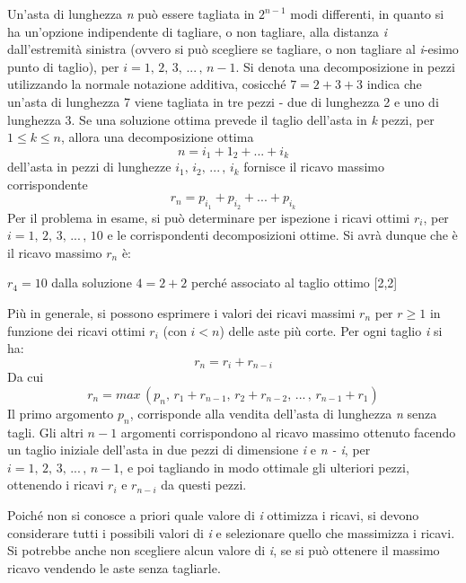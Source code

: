 \documentclass[10pt, a4paper]{report}
\begin{document}
Un'asta di lunghezza \textit{n} può essere tagliata in $2^{n-1}$ modi differenti, in quanto si ha un'opzione indipendente di tagliare, o non tagliare, alla distanza \textit{i} dall'estremità sinistra (ovvero si può scegliere se tagliare, o non tagliare al \textit{i}-esimo punto di taglio), per $i = 1,\,2,\,3,\,...\,,\,n - 1$. Si denota una decomposizione in pezzi utilizzando la normale notazione additiva, cosicché $7 = 2 + 3 + 3$ indica che un'asta di lunghezza 7 viene tagliata in tre pezzi - due di lunghezza 2 e uno di lunghezza 3. Se una soluzione ottima prevede il taglio dell'asta in \textit{k} pezzi, per $1 \leq k \leq n$, allora una decomposizione ottima
\begin{equation*}
n = i_1 + 1_2 + ... + i_k
\end{equation*}
dell'asta in pezzi di lunghezze $i_1,\,i_2,\,...\,,\,i_k$ fornisce il ricavo massimo corrispondente
\begin{equation*}
r_n = p_{i_1} + p_{i_2} + ... + p_{i_k}
\end{equation*}
Per il problema in esame, si può determinare per ispezione i ricavi ottimi $r_i$, per $i = 1,\,2,\,3,\,...\,,\,10$ e le corrispondenti decomposizioni ottime. Si avrà dunque che è il ricavo massimo $r_n$ è:
\begin{center}
$r_4 = 10$ dalla soluzione $4 = 2 + 2$ perché associato al taglio ottimo [2,2]
\end{center}
Più in generale, si possono esprimere i valori dei ricavi massimi $r_n$ per $r \geq 1$ in funzione dei ricavi ottimi $r_i$ (con $i < n$) delle aste più corte. Per ogni taglio \textit{i} si ha:
\begin{equation*}
r_n = r_i + r_{n-i}
\end{equation*}
Da cui
\begin{equation*}
r_n = max\,(p_n,\,r_1 + r_{n-1},\,r_2 + r_{n-2},\,...\,,\,r_{n-1} + r_1)
\end{equation*}
Il primo argomento $p_n$, corrisponde alla vendita dell'asta di lunghezza \textit{n} senza tagli. Gli altri $n - 1$ argomenti corrispondono al ricavo massimo ottenuto facendo un taglio iniziale dell'asta in due pezzi di dimensione \textit{i} e \textit{n - i}, per $i = 1,\,2,\,3,\,...\,,\,n - 1$, e poi tagliando in modo ottimale gli ulteriori pezzi, ottenendo i ricavi $r_i$ e $r_{n-i}$ da questi pezzi.

Poiché non si conosce a priori quale valore di \textit{i} ottimizza i ricavi, si devono considerare tutti i possibili valori di \textit{i} e selezionare quello che massimizza i ricavi. Si potrebbe anche non scegliere alcun valore di \textit{i}, se si può ottenere il massimo ricavo vendendo le aste senza tagliarle.
\end{document}
